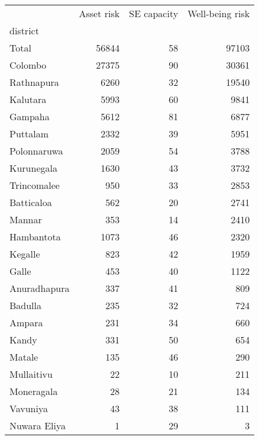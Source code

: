 \begin{tabular}{lrrr}
\toprule
{} &  Asset risk &  SE capacity &  Well-being risk \\
district     &             &              &                  \\
\midrule
Total        &       56844 &           58 &            97103 \\
Colombo      &       27375 &           90 &            30361 \\
Rathnapura   &        6260 &           32 &            19540 \\
Kalutara     &        5993 &           60 &             9841 \\
Gampaha      &        5612 &           81 &             6877 \\
Puttalam     &        2332 &           39 &             5951 \\
Polonnaruwa  &        2059 &           54 &             3788 \\
Kurunegala   &        1630 &           43 &             3732 \\
Trincomalee  &         950 &           33 &             2853 \\
Batticaloa   &         562 &           20 &             2741 \\
Mannar       &         353 &           14 &             2410 \\
Hambantota   &        1073 &           46 &             2320 \\
Kegalle      &         823 &           42 &             1959 \\
Galle        &         453 &           40 &             1122 \\
Anuradhapura &         337 &           41 &              809 \\
Badulla      &         235 &           32 &              724 \\
Ampara       &         231 &           34 &              660 \\
Kandy        &         331 &           50 &              654 \\
Matale       &         135 &           46 &              290 \\
Mullaitivu   &          22 &           10 &              211 \\
Moneragala   &          28 &           21 &              134 \\
Vavuniya     &          43 &           38 &              111 \\
Nuwara Eliya &           1 &           29 &                3 \\
\bottomrule
\end{tabular}

